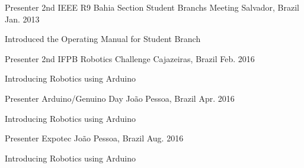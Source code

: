 

\begin{cventries}

  \cventry
    {Presenter} %
    {2nd IEEE R9 Bahia Section Student Branchs Meeting} %
    {Salvador, Brazil} %
    {Jan. 2013} %
    {
      \begin{cvitems} %
        \item {Introduced the Operating Manual for Student Branch}
      \end{cvitems}
    }

  \cventry
    {Presenter} %
    {2nd IFPB Robotics Challenge} %
    {Cajazeiras, Brazil} %
    {Feb. 2016} %
    {
      \begin{cvitems} %
        \item {Introducing Robotics using Arduino}
      \end{cvitems}
    }


  \cventry
    {Presenter} %
    {Arduino/Genuino Day} %
    {João Pessoa, Brazil} %
    {Apr. 2016} %
    {
      \begin{cvitems} %
        \item {Introducing Robotics using Arduino}
      \end{cvitems}
    }

  \cventry
    {Presenter} %
    {Expotec} %
    {João Pessoa, Brazil} %
    {Aug. 2016} %
    {
      \begin{cvitems} %
        \item {Introducing Robotics using Arduino}
      \end{cvitems}
    }

\end{cventries}
